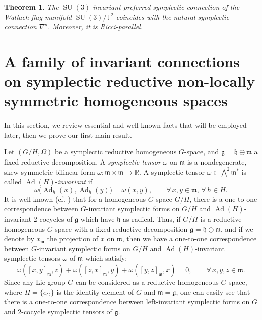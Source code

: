 \documentclass[preprint,12pt,1p]{elsarticle}
\theoremstyle{plain}
\newtheorem{theorem}{Theorem}[section]
\theoremstyle{definition}
\newcommand{\n}{\nabla}
\newcommand{\ns}{\n^\mathbf{s}}
\newcommand{\h}{\mathfrak{h}}
\newcommand{\m}{\mathfrak{m}}
\newcommand{\Ad}{\operatorname{Ad}}
\numberwithin{equation}{section}
\newcommand{\SU}{\operatorname{SU}}
\begin{document}
\begin{theorem}\label{SU3Pref}
The $\SU(3)$-invariant preferred symplectic connection of the Wallach flag manifold $\SU(3)/\mathbb{T}^2$ coincides with the natural symplectic connection $\ns$. Moreover, it is Ricci-parallel.
\end{theorem}

\section{A family of invariant connections on symplectic reductive non-locally symmetric homogeneous spaces}\label{Prelim}

In this section, we review essential and well-known facts that will be employed later, then we prove our first main result.

Let $(G/H,\Omega)$ be a symplectic reductive homogeneous $G$-space, and  $\mathfrak{g}=\mathfrak{h}\oplus\mathfrak{m}$ a fixed reductive decomposition. A \textit{symplectic tensor}  $\omega$ on $\m$ is a nondegenerate, skew-symmetric bilinear form $\omega:\mathfrak{m}\times\mathfrak{m}\to{\mathbb{R}}$. A   
symplectic tensor  $\omega\in\bigwedge^2\m^*$ is called $\Ad(H)$-\textit{invariant} if 
\begin{equation}\label{OmgSmlInv}
\omega\big(\Ad_h(x),\Ad_h(y)\big)=\omega(x,y),\qquad\forall\,x,y\in\mathfrak{m},\,\forall\,h\in H.
\end{equation}
It is well known (cf. \cite{Chu,Bo}) that for a homogeneous $G$-space $G/H$, there is a one-to-one correspondence between $G$-invariant symplectic forms on $G/H$ and $\Ad(H)$-invariant $2$-cocycles of $\mathfrak{g}$ which have $\h$ as radical. Thus, if $G/H$ is a reductive homogeneous $G$-space with a fixed reductive decomposition $\mathfrak{g}=\mathfrak{h}\oplus\mathfrak{m}$, and if we denote by $x_\mathfrak{m}$ the projection of $x$ on $\mathfrak{m}$, then we have a one-to-one correspondence between $G$-invariant symplectic forms on $G/H$ and $\Ad(H)$-invariant symplectic tensors $\omega$ of $\mathfrak{m}$ which satisfy:
\begin{equation}\label{Cocy}
\omega\left([x,y]_\mathfrak{m},z\right)+\omega\left([z,x]_\mathfrak{m},y\right)+\omega\left([y,z]_\mathfrak{m},x\right)=0,\qquad\forall\,x,y,z\in\m.
\end{equation}
Since any Lie group $G$ can be considered as a reductive homogeneous $G$-space, where $H=\{e_G\}$ is the identity element of $G$ and $\mathfrak{m}=\mathfrak{g}$, one can easily see that there is a one-to-one correspondence between left-invariant symplectic forms on $G$ and $2$-cocycle symplectic tensors of $\mathfrak{g}$.\\
\end{document}
